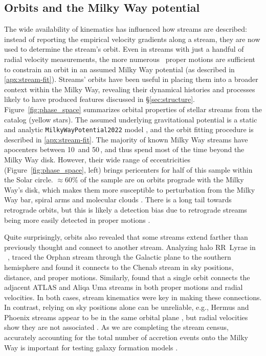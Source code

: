 \documentclass[final,5p,times,twocolumn,authoryear]{elsarticle}
\begin{document}
\subsection{Orbits and the Milky Way potential}
\label{sec:mwpotential}
The wide availability of kinematics has influenced how streams are described: instead of reporting the empirical velocity gradients along a stream, they are now used to determine the stream's orbit.
Even in streams with just a handful of radial velocity measurements, the more numerous \gaia\ proper motions are sufficient to constrain an orbit in an assumed Milky Way potential (as described in \ref{apx:stream-fit}).
Streams' orbits have been useful in placing them into a broader context within the Milky Way, revealing their dynamical histories and processes likely to have produced features discussed in \S\ref{sec:structure}.
Figure~\ref{fig:phase_space} summarizes orbital properties of stellar streams from the \citet{ibata:2023} catalog (yellow stars).
The assumed underlying gravitational potential is a static and analytic \texttt{MilkyWayPotential2022} model \citep{price-whelan:2017}, and the orbit fitting procedure is described in \ref{apx:stream-fit}.
The majority of known Milky Way streams have apocenters between 10\,\unit{\kpc} and 50\,\unit{\kpc}, and thus spend most of the time beyond the Milky Way disk.
However, their wide range of eccentricities (Figure~\ref{fig:phase_space}, left) brings pericenters for half of this sample within the Solar circle.
$\approx60\%$ of the sample are on orbits prograde with the Milky Way's disk, which makes them more susceptible to perturbation from the Milky Way bar, spiral arms and molecular clouds \citep[e.g.,][]{pearson:2017, banik:2019}.
There is a long tail towards retrograde orbits, but this is likely a detection bias due to retrograde streams being more easily detected in proper motions \citep[e.g.,][]{ibata:2021}.

Quite surprisingly, orbits also revealed that some streams extend farther than previously thought and connect to another stream.
Analyzing halo RR~Lyrae in \gaia~, \citet{koposov:2019} traced the Orphan stream through the Galactic plane to the southern hemisphere and found it connects to the Chenab stream in sky positions, distance, and proper motions.
Similarly, \citet{li:2021} found that a single orbit connects the adjacent ATLAS and Aliqa Uma streams in both proper motions and radial velocities.
In both cases, stream kinematics were key in making these connections.
In contrast, relying on sky positions alone can be unreliable, e.g., Hermus and Phoenix streams appear to be in the same orbital plane \citep{grillmair:2016b}, but radial velocities show they are not associated \citep{martin:2018}.
As we are completing the stream census, accurately accounting for the total number of accretion events onto the Milky Way is important for testing galaxy formation models \citep{pillepich:2015, shipp:2023, wright:2023, khoperskov:2023}.
\end{document}
